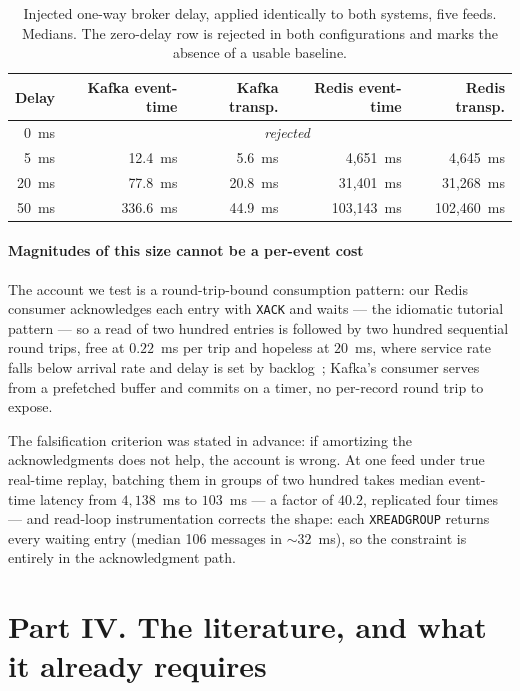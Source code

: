\documentclass[10pt,journal,onecolumn]{IEEEtran}
\newcommand{\kafka}{Kafka}
\newcommand{\redis}{Redis}
\begin{document}
\begin{table}[t]
\caption[Injected one-way broker delay, applied identically to both systems, five feeds]{Injected one-way broker delay, applied identically to both systems, five feeds. Medians.
The zero-delay row is rejected in both configurations and marks the absence of a usable baseline.}
\label{tab:netem}
\begin{tabular}{rrrrr}
\toprule
Delay & \kafka{} event-time & \kafka{} transp. & \redis{} event-time & \redis{} transp. \\
\midrule
0~ms  & \multicolumn{4}{c}{\emph{rejected}} \\
5~ms  & 12.4~ms  & 5.6~ms  & 4{,}651~ms   & 4{,}645~ms \\
20~ms & 77.8~ms  & 20.8~ms & 31{,}401~ms  & 31{,}268~ms \\
50~ms & 336.6~ms & 44.9~ms & 103{,}143~ms & 102{,}460~ms \\
\bottomrule
\end{tabular}
\end{table}


\paragraph{Magnitudes of this size cannot be a per-event cost} The account we test is a
round-trip-bound consumption pattern: our \redis{} consumer acknowledges each entry with
\texttt{XACK} and waits --- the idiomatic tutorial pattern --- so a read of two hundred
entries is followed by two hundred sequential round trips, free at $0.22$~ms per trip and
hopeless at $20$~ms, where service rate falls below arrival rate and delay is set by
backlog~\cite{kleinrock1975queueing}; \kafka{}'s consumer serves from a prefetched
buffer and commits on a timer, no per-record round trip to expose.

The falsification criterion was stated in advance: if amortizing the acknowledgments
does not help, the account is wrong. At one feed under true real-time replay, batching them
in groups of two hundred takes median event-time latency from $4{,}138$~ms to $103$~ms --- a factor of
$\mathbf{40.2}$, replicated four times --- and read-loop instrumentation corrects the
shape: each \texttt{XREADGROUP} returns every waiting entry (median 106 messages in
${\sim}32$~ms),
so the constraint is entirely in the acknowledgment path.
\section*{Part IV. The literature, and what it already requires}
\end{document}
